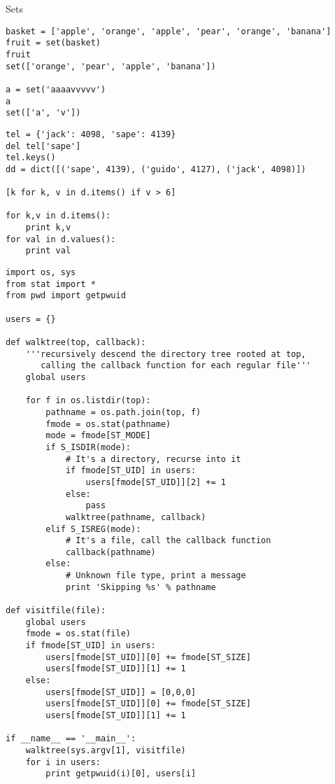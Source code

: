 \documentclass[9pt]{amsart}
\begin{document}
\begin{multicols}{2}
Sets
\begin{lstlisting}
basket = ['apple', 'orange', 'apple', 'pear', 'orange', 'banana']
fruit = set(basket) 
fruit
set(['orange', 'pear', 'apple', 'banana'])

a = set('aaaavvvvv')
a
set(['a', 'v'])
\end{lstlisting}


\noindent {\textcolor {blue} {\em Dictionaries}}   
\begin{lstlisting}
tel = {'jack': 4098, 'sape': 4139}
del tel['sape']
tel.keys()
dd = dict([('sape', 4139), ('guido', 4127), ('jack', 4098)])

[k for k, v in d.items() if v > 6]

for k,v in d.items():
	print k,v
for val in d.values():
	print val
\end{lstlisting}

\begin{lstlisting}
import os, sys
from stat import *
from pwd import getpwuid

users = {}

def walktree(top, callback):
    '''recursively descend the directory tree rooted at top,
       calling the callback function for each regular file'''
    global users

    for f in os.listdir(top):
        pathname = os.path.join(top, f)
        fmode = os.stat(pathname)
        mode = fmode[ST_MODE]
        if S_ISDIR(mode):
            # It's a directory, recurse into it
            if fmode[ST_UID] in users:
                users[fmode[ST_UID]][2] += 1
            else:
                pass
            walktree(pathname, callback)
        elif S_ISREG(mode):
            # It's a file, call the callback function
            callback(pathname)
        else:
            # Unknown file type, print a message
            print 'Skipping %s' % pathname

def visitfile(file):
    global users
    fmode = os.stat(file)
    if fmode[ST_UID] in users:
        users[fmode[ST_UID]][0] += fmode[ST_SIZE]
        users[fmode[ST_UID]][1] += 1
    else:
        users[fmode[ST_UID]] = [0,0,0]
        users[fmode[ST_UID]][0] += fmode[ST_SIZE]
        users[fmode[ST_UID]][1] += 1

if __name__ == '__main__':
    walktree(sys.argv[1], visitfile)
    for i in users:
        print getpwuid(i)[0], users[i]
\end{lstlisting}        

\noindent {\textcolor {blue} {\em OO programming}}   


\end{multicols}
\end{document}
